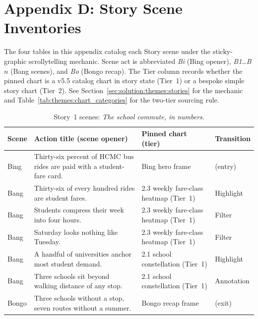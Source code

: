 \chapter*{Appendix D: Story Scene Inventories}
\label{appendix:scenes}

The four tables in this appendix catalog each Story scene under the
sticky-graphic scrollytelling mechanic. Scene act is abbreviated
\textit{Bi} (Bing opener), \textit{B1}\ldots\textit{B$n$} (Bang
scenes), and \textit{Bo} (Bongo recap). The Tier column records
whether the pinned chart is a v5.5 catalog chart in story state
(Tier~1) or a bespoke simple story chart (Tier~2). See
Section~\ref{sec:solution:themes:stories} for the mechanic and
Table~\ref{tab:themes:chart_categories} for the two-tier sourcing rule.

\begin{table}[!htbp]
\centering
\caption{Story~1 scenes: \textit{The school commute, in numbers}.}
\label{tab:themes:story_school}
\footnotesize
\begin{tabularx}{\linewidth}{p{0.8cm}Xp{2.7cm}p{1.6cm}}
\hline
\textbf{Scene} & \textbf{Action title (scene opener)} & \textbf{Pinned chart (tier)} & \textbf{Transition} \\
\hline
Bing  & Thirty-six percent of HCMC bus rides are paid with a student-fare card.        & Bing hero frame                     & (entry)    \\
Bang  & Thirty-six of every hundred rides are student fares.                          & 2.3 weekly fare-class heatmap (Tier~1) & Highlight  \\
Bang  & Students compress their week into four hours.                                 & 2.3 weekly fare-class heatmap (Tier~1) & Filter     \\
Bang  & Saturday looks nothing like Tuesday.                                          & 2.3 weekly fare-class heatmap (Tier~1) & Filter     \\
Bang  & A handful of universities anchor most student demand.                         & 2.1 school constellation (Tier~1)     & Highlight  \\
Bang  & Three schools sit beyond walking distance of any stop.                        & 2.1 school constellation (Tier~1)     & Annotation \\
Bongo & Three schools without a stop, seven routes without a summer.                   & Bongo recap frame                   & (exit)     \\
\hline
\end{tabularx}
\end{table}

